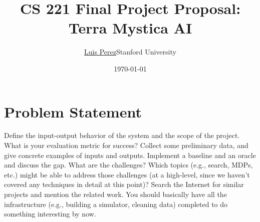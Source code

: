 \documentclass[10pt]{article}
\title{CS 221 Final Project Proposal: Terra Mystica AI}
\author{\href{mailto:luisperez@cs.stanford.edu}{Luis Perez}{Stanford University}}
\date{\today}
\begin{document}
 \begin{center}
  \end{center}

\section{Problem Statement}
Define the input-output behavior of the system and the scope of the project. What is your evaluation metric for success? Collect some preliminary data, and give concrete examples of inputs and outputs. Implement a baseline and an oracle and discuss the gap. What are the challenges? Which topics (e.g., search, MDPs, etc.) might be able to address those challenges (at a high-level, since we haven't covered any techniques in detail at this point)? Search the Internet for similar projects and mention the related work. You should basically have all the infrastructure (e.g., building a simulator, cleaning data) completed to do something interesting by now.
\end{document}
